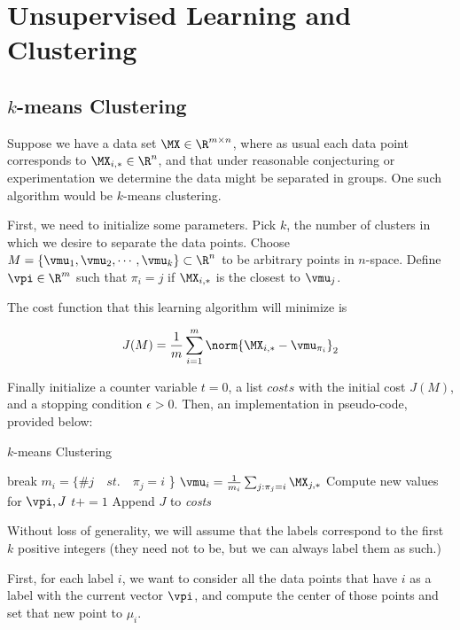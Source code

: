 \chapter{Unsupervised Learning and Clustering}

\section{$k$-means Clustering}

Suppose we have a data set $\MX\in\R^{m \times n}$, where as usual each data point corresponds to $\MX_{i,*}\in\R^n$, and that under reasonable conjecturing or experimentation we determine the data might be separated in groups. One such algorithm would be $k$-means clustering.

First, we need to initialize some parameters. Pick $k$, the number of clusters in which we desire to separate the data points. Choose $M=\{\vmu_1, \vmu_2, \cdots, \vmu_k\} \subset\R^n$ to be arbitrary points in $n$-space. Define $\vpi\in\R^m$ such that $\pi_i = j$ if $\MX_{i,*}$ is the closest to $\vmu_j$. 

The cost function that this learning algorithm will minimize is

$$J(M) = \frac{1}{m} \sum_{i=1}^{m} \norm{ \MX_{i,*} - \vmu_{\pi_i}}_2 $$ 

Finally initialize a counter variable $t=0$, a list $\textit{costs}$ with the initial cost $J(M)$, and a stopping condition $\epsilon>0$. Then, an implementation in pseudo-code, provided below:

\begin{algorithm}
    \caption{$k$-means Clustering}
    \begin{algorithmic}[1]
		\State break
		\EndIf
        \State $m_i =\{ \#j \quad st. \quad \pi_j = i$ \}
        \State $\vmu_i = \frac{1}{m_i}\sum_{j:\pi_j=i} \MX_{j,*}$
		\EndFor
		\State Compute new values for $\vpi, J$
		\State $t+=1$
		\State Append $J$ to \textit{costs}
		\EndWhile
	\end{algorithmic} 
\end{algorithm}

Without loss of generality, we will assume that the labels correspond to the first $k$ positive integers (they need not to be, but we can always label them as such.)

First, for each label $i$, we want to consider all the data points that have $i$ as a label with the current vector $\vpi$, and compute the center of those points and set that new point to $\mu_i$.

